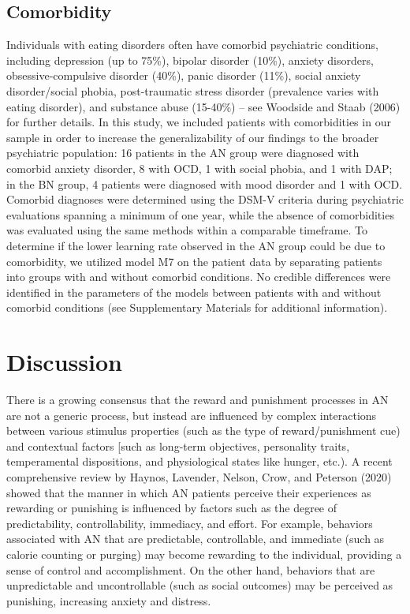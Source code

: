 \documentclass[
  man,floatsintext]{apa6}
\begin{document}
\hypertarget{comorbidity}{%
\subsection{Comorbidity}\label{comorbidity}}

Individuals with eating disorders often have comorbid psychiatric conditions, including depression (up to 75\%), bipolar disorder (10\%), anxiety disorders, obsessive-compulsive disorder (40\%), panic disorder (11\%), social anxiety disorder/social phobia, post-traumatic stress disorder (prevalence varies with eating disorder), and substance abuse (15-40\%) -- see Woodside and Staab (2006) for further details. In this study, we included patients with comorbidities in our sample in order to increase the generalizability of our findings to the broader psychiatric population: 16 patients in the AN group were diagnosed with comorbid anxiety disorder, 8 with OCD, 1 with social phobia, and 1 with DAP; in the BN group, 4 patients were diagnosed with mood disorder and 1 with OCD. Comorbid diagnoses were determined using the DSM-V criteria during psychiatric evaluations spanning a minimum of one year, while the absence of comorbidities was evaluated using the same methods within a comparable timeframe. To determine if the lower learning rate observed in the AN group could be due to comorbidity, we utilized model M7 on the patient data by separating patients into groups with and without comorbid conditions. No credible differences were identified in the parameters of the models between patients with and without comorbid conditions (see Supplementary Materials for additional information).

\hypertarget{discussion}{%
\section{Discussion}\label{discussion}}

There is a growing consensus that the reward and punishment processes in AN are not a generic process, but instead are influenced by complex interactions between various stimulus properties (such as the type of reward/punishment cue) and contextual factors {[}such as long-term objectives, personality traits, temperamental dispositions, and physiological states like hunger, etc.). A recent comprehensive review by Haynos, Lavender, Nelson, Crow, and Peterson (2020) showed that the manner in which AN patients perceive their experiences as rewarding or punishing is influenced by factors such as the degree of predictability, controllability, immediacy, and effort. For example, behaviors associated with AN that are predictable, controllable, and immediate (such as calorie counting or purging) may become rewarding to the individual, providing a sense of control and accomplishment. On the other hand, behaviors that are unpredictable and uncontrollable (such as social outcomes) may be perceived as punishing, increasing anxiety and distress.
\end{document}
